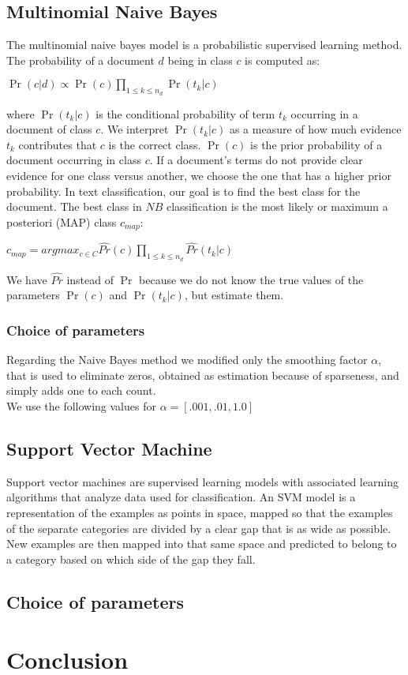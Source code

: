 \documentclass[11pt]{article}
\begin{document}
\subsection{Multinomial Naive Bayes}
The multinomial naive bayes model is a probabilistic supervised learning method. The probability of a document $d$ being in class $c$ is computed as: \\
\begin{center}
{$\Pr{(c|d)} \propto{\Pr{(c)} \prod_{1\leq{k}\leq{n_{d}}} \Pr{(t_{k} | c)}}$}
\end{center}
where $\Pr{(t_{k} | c)}$ is the conditional probability of term $t_{k}$ occurring in a document of class $c$. We interpret $\Pr{(t_{k} | c)}$ as a measure of how much evidence $t_{k}$ contributes that $c$ is the correct class. $\Pr{(c)}$ is the prior probability of a document occurring in class $c$. If a document's terms do not provide clear evidence for one class versus another, we choose the one that has a higher prior probability. In text classification, our goal is to find the best class for the document. The best class in $NB$ classification is the most likely or maximum a posteriori (MAP) class $c_{map}$: 
\begin{center}
$c_{map} = argmax_{c \in{C}} \hat{Pr} (c) \prod_{1\leq{k}\leq{n_{d}}} \hat{Pr} (t_{k} | c)$
\end{center}
We have $\hat{Pr}$ instead of $\Pr$ because we do not know the true values of the parameters $\Pr{(c)}$ and $\Pr{(t_{k} | c)}$, but estimate them. 

\subsubsection{Choice of parameters}
Regarding the Naive Bayes method we modified only the smoothing factor $\alpha$, that is used to eliminate zeros, obtained as estimation because of sparseness, and simply adds one to each count. \\
We use the following values for $\alpha = [.001,.01,1.0]$

\subsection{Support Vector Machine}
Support vector machines are supervised learning models with associated learning algorithms that analyze data used for classification. An SVM model is a representation of the examples as points in space, mapped so that the examples of the separate categories are divided by a clear gap that is as wide as possible. New examples are then mapped into that same space and predicted to belong to a category based on which side of the gap they fall. 

\subsection{Choice of parameters}


\section{Conclusion}
\end{document}
